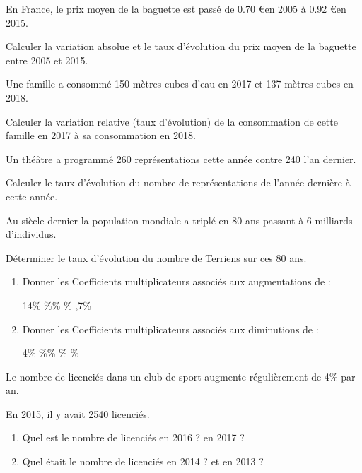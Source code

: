 \exo 

 En  France,  le  prix  moyen  de  la  baguette  est  passé  de 0.70 \euro en 2005 à 0.92 \euro en 2015.

Calculer  la  variation  absolue  et  le  taux  d'évolution  du  prix  moyen  de  la  baguette  entre 2005 et 2015.

\medskip

\exo 

Une famille a consommé 150 mètres cubes d'eau en 2017 et 137 mètres cubes en 2018.

Calculer la variation relative (taux d'évolution) de la consommation de cette famille en 2017 à sa consommation en 2018.

\exo 

Un théâtre a programmé 260 représentations cette année contre 240 l'an dernier.

Calculer le taux d'évolution du nombre de représentations de l'année dernière à cette année.

\exo 

Au siècle dernier la population mondiale a triplé en 80 ans passant à 6 milliards d'individus.

Déterminer le taux d'évolution du nombre de Terriens sur ces 80 ans.

\exo

\begin{enumerate}
\item Donner les Coefficients multiplicateurs associés aux augmentations de : 

14\% \qquad{}\%\qquad{}\% \qquad{}\% \qquad{},7\%

\item Donner les Coefficients multiplicateurs associés aux diminutions de : 

4\% \qquad{}\%\qquad{}\% \qquad{}\% \qquad {}\%
\end{enumerate}

\exo

 Le nombre de licenciés dans un club de sport augmente régulièrement de 4\% par an.

En 2015, il y avait 2540 licenciés.

\begin{enumerate}
\item Quel est le nombre de licenciés en 2016 ? en 2017 ?
\item Quel était le nombre de licenciés en 2014 ? et en 2013 ?
\end{enumerate}




